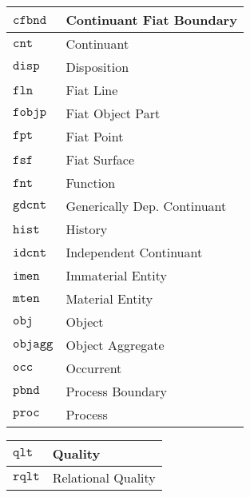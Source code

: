 \documentclass[ao]{iosart2x}
\newcommand{\cn}[1]{\mathtt{#1}}
\newcommand{\bfo}{{\textsc{bfo}}}
\newcommand{\cntbcat}{\cn{cnt}}
\newcommand{\idcntbcat}{\cn{idcnt}}
\newcommand{\gdcntbcat}{\cn{gdcnt}}
\newcommand{\mtenbcat}{\cn{mten}}
\newcommand{\imenbcat}{\cn{imen}}
\newcommand{\objbcat}{\cn{obj}}
\newcommand{\fobjbcat}{\cn{fobjp}}
\newcommand{\objaggbcat}{\cn{objagg}}
\newcommand{\cfbndbcat}{\cn{cfbnd}}
\newcommand{\occbcat}{\cn{occ}}
\newcommand{\procbcat}{\cn{proc}}
\newcommand{\pbndbcat}{\cn{pbnd}}
\newcommand{\qltbcat}{\cn{qlt}}
\newcommand{\rqltbcat}{\cn{rqlt}}
\newcommand{\histbcat}{\cn{hist}}
\newcommand{\dispbcat}{\cn{disp}}
\newcommand{\fntbcat}{\cn{fnt}}
\newcommand{\fptbcat}{\cn{fpt}}
\newcommand{\flnbcat}{\cn{fln}}
\newcommand{\fsfbcat}{\cn{fsf}}
\newcommand{\bfopartic}{\textsc{par}}
\begin{document}

\begin{table*}
\caption{Categories of {\bfo}.}\label{table_cat_bfo}
\begin{minipage}{0.43\textwidth}
\hspace{30pt}
\begin{tabular}{|p{}|p{}|}\hline
$\cfbndbcat$ & Continuant Fiat Boundary\\\hline
$\cntbcat$ & Continuant \\\hline
$\dispbcat$ & Disposition \\\hline
$\flnbcat$ & Fiat Line \\\hline
$\fobjbcat$ & Fiat Object Part\\\hline
$\fptbcat$ & Fiat Point \\\hline
$\fsfbcat$ & Fiat Surface \\\hline
$\fntbcat$ & Function \\\hline
$\gdcntbcat$ & Generically Dep. Continuant \\\hline
$\histbcat$ & History \\\hline
$\idcntbcat$ & Independent Continuant \\\hline
$\imenbcat$ & Immaterial Entity \\\hline
$\mtenbcat$ & Material Entity \\\hline
$\objbcat$ & Object \\\hline
$\objaggbcat$ & Object Aggregate \\\hline
$\occbcat$ & Occurrent \\\hline
$\pbndbcat$ & Process Boundary \\\hline
$\procbcat$ & Process  \\\hline
\end{tabular}
\end{minipage}%
\mbox{}\hfill{}
\begin{minipage}{0.43\textwidth}
  \hspace{-30pt}\begin{tabular}{|p{}|p{}|}
    \hline
$\qltbcat$ & Quality \\\hline
$\rqltbcat$ & Relational Quality \\\hline

\end{tabular}
\end{minipage}
\end{table*}
\end{document}
